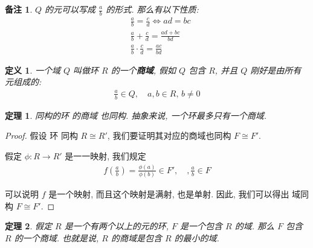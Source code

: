 \documentclass[utf8]{ctexbook}
\newtheorem{theorem}{定理}[section]
\newtheorem{definition}{定义}[section]
\newtheorem{memo}{备注}[section]
\begin{document}
\begin{memo}
$Q$ 的元可以写成 $\frac{a}{b}$ 的形式. 那么有以下性质:
\begin{align*}
& \frac{a}{b} = \frac{c}{d} \iff ad = bc \\
& \frac{a}{b} + \frac{c}{d} = \frac{ad + bc}{bd} \\
& \frac{a}{b} \cdot \frac{c}{d} = \frac{ac}{bd}
\end{align*}

\end{memo}

\begin{definition}\label{def_field_of_fraction}
一个域 $Q$ 叫做环 $R$ 的一个\textbf{商域}, 假如 $Q$ 包含 $R$, 并且 $Q$ 刚好是由所有元组成的:
\begin{align*}
\frac{a}{b} \in Q, \quad a, b \in R, \, b \neq 0
\end{align*}

\end{definition}

\begin{theorem}\label{theorem_fraction_field_unique}
同构的环 的商域 也同构. 抽象来说, 一个环最多只有一个商域.
\end{theorem}

\begin{proof}
假设 环 同构 $R \cong R'$, 我们要证明其对应的商域也同构 $F \cong F'$.

假定 $\phi: R \longrightarrow R'$ 是一一映射, 我们规定 
\begin{align*}
f(\frac{a}{b}) = \frac{\phi(a)}{\phi(b)} \in F', \quad, \frac{a}{b} \in F
\end{align*}

可以说明 $f$ 是一个映射, 而且这个映射是满射, 也是单射. 因此, 我们可以得出 域同构 $F \cong F'$.


\end{proof}


\begin{theorem}\label{theorem_min_field_of_fraction}
假定 $R$ 是一个有两个以上的元的环, $F$ 是一个包含 $R$ 的域. 那么 $F$ 包含 $R$ 的一个商域. 也就是说, $R$ 的商域是包含 $R$ 的最小的域. 
\end{theorem}
\end{document}
